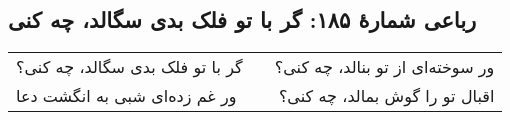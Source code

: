 \begin{center}
\section*{رباعی شمارهٔ ۱۸۵: گر با تو فلک بدی سگالد، چه کنی}
\label{sec:185}
\begin{longtable}{l p{0.5cm} r}
گر با تو فلک بدی سگالد، چه کنی؟
&&
ور سوخته‌ای از تو بنالد، چه کنی؟
\\
ور غم زده‌ای شبی به انگشت دعا
&&
اقبال تو را گوش بمالد، چه کنی؟
\\
\end{longtable}
\end{center}
